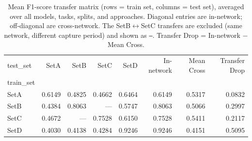 \begin{table}
\caption{Mean F1-score transfer matrix (rows = train set, columns = test set), averaged over all models, tasks, splits, and approaches. Diagonal entries are in-network; off-diagonal are cross-network. The SetB$\leftrightarrow$SetC transfers are excluded (same network, different capture period) and shown as \texttt{---}. Transfer Drop = In-network $-$ Mean Cross.}
\label{tab:q3_matrix}
\begin{tabular}{lrrrrrrr}
\toprule
test_set & SetA & SetB & SetC & SetD & In-network & Mean Cross & Transfer Drop \\
train_set &  &  &  &  &  &  &  \\
\midrule
SetA & 0.6149 & 0.4825 & 0.4662 & 0.6464 & 0.6149 & 0.5317 & 0.0832 \\
SetB & 0.4384 & 0.8063 & --- & 0.5747 & 0.8063 & 0.5066 & 0.2997 \\
SetC & 0.4672 & --- & 0.7528 & 0.6150 & 0.7528 & 0.5411 & 0.2117 \\
SetD & 0.4030 & 0.4138 & 0.4284 & 0.9246 & 0.9246 & 0.4151 & 0.5095 \\
\bottomrule
\end{tabular}
\end{table}
